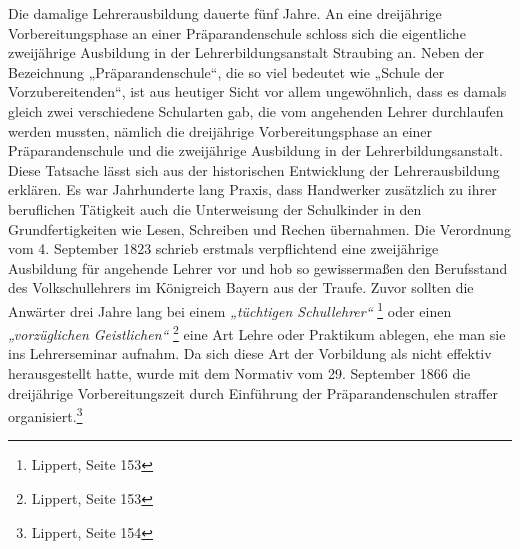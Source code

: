 \documentclass[a4paper]{article}
\newcommand\textstyleZitate[1]{\textit{#1}}
\begin{document}
Die damalige Lehrerausbildung dauerte fünf Jahre. An eine dreijährige
Vorbereitungsphase an einer Präparandenschule schloss sich die
eigentliche zweijährige Ausbildung in der Lehrerbildungsanstalt
Straubing an. Neben der Bezeichnung „Präparandenschule“, die so viel
bedeutet wie „Schule der Vorzubereitenden“, ist aus heutiger Sicht vor
allem ungewöhnlich, dass es damals gleich zwei verschiedene Schularten
gab, die vom angehenden Lehrer durchlaufen werden mussten, nämlich die
dreijährige Vorbereitungsphase an einer Präparandenschule und die
zweijährige Ausbildung in der Lehrerbildungsanstalt. Diese Tatsache
lässt sich aus der historischen Entwicklung der Lehrerausbildung
erklären. Es war Jahrhunderte lang Praxis, dass Handwerker zusätzlich
zu ihrer beruflichen Tätigkeit auch die Unterweisung der Schulkinder in
den Grundfertigkeiten wie Lesen, Schreiben und Rechen übernahmen. Die
Verordnung vom 4. September 1823 schrieb erstmals verpflichtend eine
zweijährige Ausbildung für angehende Lehrer vor und hob so
gewissermaßen den Berufsstand des Volkschullehrers im Königreich Bayern
aus der Traufe. Zuvor sollten die Anwärter drei Jahre lang bei einem
\textstyleZitate{„tüchtigen Schullehrer“ }\footnote{ Lippert, Seite
153} oder einen \textstyleZitate{„vorzüglichen Geistlichen“ }\footnote{
Lippert, Seite 153} eine Art Lehre oder Praktikum ablegen, ehe man sie
ins Lehrerseminar aufnahm. Da sich diese Art der Vorbildung als nicht
effektiv herausgestellt hatte, wurde mit dem Normativ vom 29. September
1866 die dreijährige Vorbereitungszeit durch Einführung der
Präparandenschulen straffer organisiert.\footnote{ Lippert, Seite 154}
\end{document}
